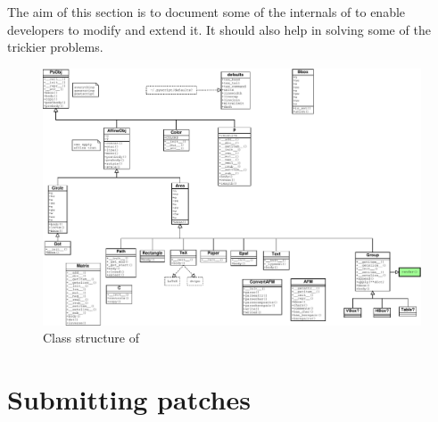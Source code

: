 \documentclass[a4paper]{book}
\begin{document}
The aim of this section is to document some of the internals of
\pyscript to enable developers to modify and extend it. 
It should also help in solving some of the trickier problems.

\begin{figure}[h]
  \begin{center}
    \begin{sideways}
      \includegraphics[height=.9\textwidth]{class_structure}
    \end{sideways}
  \end{center}
  \caption{Class structure of \pyscript}
  \label{fig:classes}
\end{figure}

\section{Submitting patches}
\end{document}
